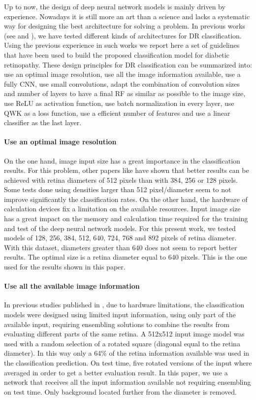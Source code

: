\documentclass[review]{elsarticle}
\theoremstyle{definition} %
\theoremstyle{remark}
\begin{document}
Up to now, the design of deep neural network models is mainly driven  by experience. Nowadays it is still more an art than a science and lacks a systematic way for designing the best architecture for solving a problem. In previous works (see \cite{jdelatorre-2016} and \cite{DELATORRE2017}), we have tested different kinds of architectures for DR classification. Using the previous experience in such works we report here a set of guidelines that have been used to build the proposed classification model for diabetic retinopathy. These design principles for DR classification can be summarized into: use an optimal image resolution, use all the image information available, use a fully CNN, use small convolutions, adapt the combination of convolution sizes and number of layers to have a final RF as similar as possible to the image size, use ReLU as activation function, use batch normalization in every layer, use QWK as a loss function, use a efficient number of features and use a linear classifier as the last layer.

\paragraph{Use an optimal image resolution} On the one hand, image input size has a great importance in the classification results. For this problem, other papers like \cite{jdelatorre-2016} have shown that better results can be achieved with retina diameters of 512 pixels than with 384, 256 or 128 pixels. Some tests done using densities larger than 512 pixel/diameter seem to not improve significantly the classification rates. On the other hand, the hardware of calculation devices fix a limitation on the available resources. Input image size has a great impact on the memory and calculation time required for the training and test of the deep neural network models. For this present work, we tested models of 128, 256, 384, 512, 640, 724, 768 and 892 pixels of retina diameter. With this dataset, diameters greater than 640 does not seem to report better results. The optimal size is a retina diameter equal to 640 pixels. This is the one used for the results shown in this paper.

\paragraph{Use all the available image information} In previous studies published in \cite{jdelatorre-2016}, due to hardware limitations, the classification models were designed using limited input information, using only part of the available input, requiring ensembling solutions to combine the results from evaluating different parts of the same retina. A 512x512 input image model was used with a random selection of a rotated square (diagonal equal to the retina diameter). In this way only a 64\% of the retina information available was used in the classification prediction. On test time, five rotated versions of the input where averaged in order to get a better evaluation result. In this paper, we use a network that receives all the input information available not requiring ensembling on test time. Only background located further from the diameter is removed.
\end{document}
